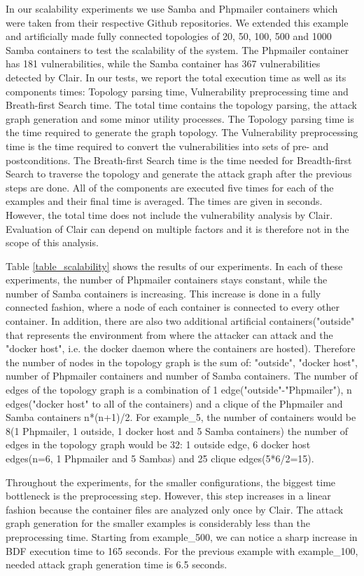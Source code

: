 In our scalability experiments we use Samba \cite{samba} and Phpmailer \cite{phpmailer} containers which were taken from their respective Github repositories. We extended this example and artificially made fully connected topologies of 20, 50, 100, 500 and 1000 Samba containers to test the scalability of the system. The Phpmailer container has 181 vulnerabilities, while the Samba container has 367 vulnerabilities detected by Clair. In our tests, we report the total execution time as well as its components times: Topology parsing time, Vulnerability preprocessing time and Breath-first Search time. The total time contains the topology parsing, the attack graph generation and some minor utility processes. The Topology parsing time is the time required to generate the graph topology. The Vulnerability preprocessing time is the time required to convert the vulnerabilities into sets of pre- and postconditions. The Breath-first Search time is the time needed for Breadth-first Search to traverse the topology and generate the attack graph after the previous steps are done. All of the components are executed five times for each of the examples and their final time is averaged. The times are given in seconds.  However, the total time does not include the vulnerability analysis by Clair. Evaluation of Clair can depend on multiple factors and it is therefore not in the scope of this analysis.

Table \ref{table_scalability} shows the results of our experiments. In each of these experiments, the number of Phpmailer containers stays constant, while the number of Samba containers is increasing. This increase is done in a fully connected fashion, where a node of each container is connected to every other container. In addition, there are also two additional artificial containers("outside" that represents the environment from where the attacker can attack and the "docker host", i.e. the docker daemon where the containers are hosted). Therefore the number of nodes in the topology graph is the sum of: "outside", "docker host", number of Phpmailer containers and number of Samba containers. The number of edges of the topology graph is a combination of 1 edge("outside"-"Phpmailer"), n edges("docker host" to all of the containers) and a clique of the Phpmailer and Samba containers n*(n+1)/2. For example\_5, the number of containers would be 8(1 Phpmailer, 1 outside, 1 docker host and 5 Samba containers) the number of edges in the topology graph would be 32: 1 outside edge, 6 docker host edges(n=6, 1 Phpmailer and 5 Sambas) and 25 clique edges(5*6/2=15).

Throughout the experiments, for the smaller configurations, the biggest time bottleneck is the preprocessing step. However, this step increases in a linear fashion because the container files are analyzed only once by Clair. The attack graph generation for the smaller examples is considerably less than the preprocessing time. Starting from example\_500, we can notice a sharp increase in BDF execution time to 165 seconds. For the previous example with example\_100, needed attack graph generation time is 6.5 seconds.

